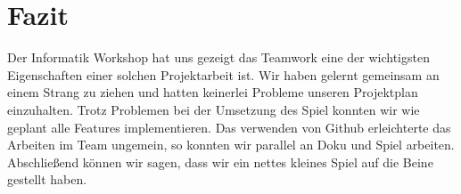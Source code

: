 \chapter{Fazit}
Der Informatik Workshop hat uns gezeigt das Teamwork eine der wichtigsten Eigenschaften einer solchen Projektarbeit ist. Wir haben gelernt gemeinsam an einem Strang zu ziehen und hatten keinerlei Probleme unseren Projektplan einzuhalten. Trotz Problemen bei der Umsetzung des Spiel konnten wir wie geplant alle Features implementieren. Das verwenden von Github erleichterte das Arbeiten im Team ungemein, so konnten wir parallel an Doku und Spiel arbeiten. Abschließend können wir sagen, dass wir ein nettes kleines Spiel auf die Beine gestellt haben.